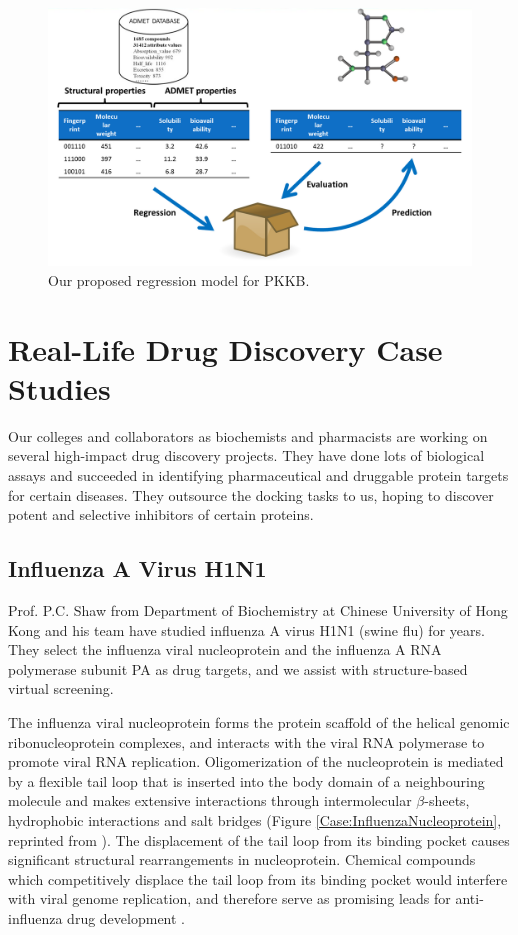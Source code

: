 \begin{figure}
\centering
\includegraphics[width=\linewidth]{PKKB/Regression.png}
\caption{Our proposed regression model for PKKB.}
\label{PKKB:Regression}
\end{figure}

\section{Real-Life Drug Discovery Case Studies}

Our colleges and collaborators as biochemists and pharmacists are working on several high-impact drug discovery projects. They have done lots of biological assays and succeeded in identifying pharmaceutical and druggable protein targets for certain diseases. They outsource the docking tasks to us, hoping to discover potent and selective inhibitors of certain proteins.

\subsection{Influenza A Virus H1N1}

Prof. P.C. Shaw from Department of Biochemistry at Chinese University of Hong Kong and his team have studied influenza A virus H1N1 (swine flu) for years. They select the influenza viral nucleoprotein and the influenza A RNA polymerase subunit PA as drug targets, and we assist with structure-based virtual screening.

The influenza viral nucleoprotein forms the protein scaffold of the helical genomic ribonucleoprotein complexes, and interacts with the viral RNA
polymerase to promote viral RNA replication. Oligomerization of the nucleoprotein is mediated by a flexible tail loop that is inserted into the body domain of a neighbouring molecule and makes extensive interactions through intermolecular $\beta$-sheets, hydrophobic interactions and salt bridges (Figure \ref{Case:InfluenzaNucleoprotein}, reprinted from \citep{1140}). The displacement of the tail loop from its binding pocket causes significant structural rearrangements in nucleoprotein. Chemical compounds which competitively displace the tail loop from its binding pocket would interfere with viral genome replication, and therefore serve as promising leads for anti-influenza drug development \citep{1140}.

